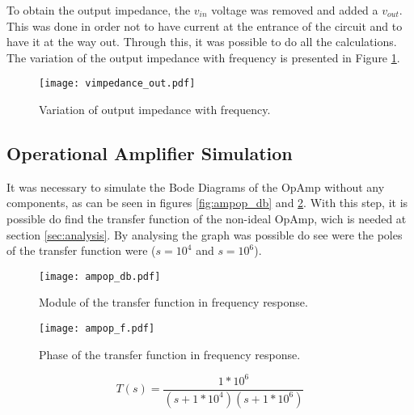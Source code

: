 \vspace{0.5cm}
To obtain the output impedance, the $v_{in}$ voltage was removed and added a $v_{out}$. This was done in order not to have current at the entrance of the circuit and to have it at the way out. Through this, it was possible to do all the calculations. The variation of the output impedance with frequency is presented in Figure \ref{fig:vimpedance_out}.

\begin{figure}[h] \centering
  \texttt{[image: vimpedance\_out.pdf]}
    \caption{Variation of output impedance with frequency.}
     \label{fig:vimpedance_out}
\end{figure}

\newpage
\subsection{Operational Amplifier Simulation}

It was necessary to simulate the Bode Diagrams of the OpAmp without any components, as can be seen in figures \ref{fig:ampop_db} and \ref{fig:ampop_f}. With this step, it is possible do find the transfer function of the non-ideal OpAmp, wich is needed at section \ref{sec:analysis}. By analysing the graph was possible do see were the poles of the transfer function were ($s=10^4$ and $s=10^6$).


\begin{figure}[h]
  \centering
  \begin{minipage}[b]{0.4\textwidth}
    \texttt{[image: ampop\_db.pdf]}
    \caption{Module of the transfer function in frequency response.}
    \label{fig:ampop_db}
  \end{minipage}
  \hfill
  \begin{minipage}[b]{0.4\textwidth}
    \texttt{[image: ampop\_f.pdf]}
    \caption{Phase of the transfer function in frequency response.}
    \label{fig:ampop_f}
  \end{minipage}
\end{figure}

\begin{equation}
    T(s)=\frac{1*10^6}{(s+1*10^4)(s+1*10^6)}
    \label{eq:tfsim}
\end{equation}
